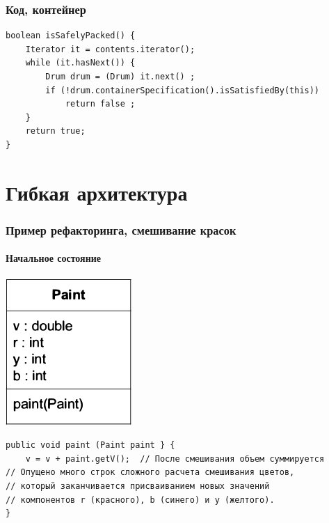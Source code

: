 \documentclass[xetex,mathserif,serif]{beamer}
\begin{document}
	\begin{frame}[fragile]
		\frametitle{Код, контейнер}
		\begin{verbatim}
boolean isSafelyPacked() {
    Iterator it = contents.iterator();
    while (it.hasNext()) {
        Drum drum = (Drum) it.next() ;
        if (!drum.containerSpecification().isSatisfiedBy(this))
            return false ;
    }
    return true;
}
		\end{verbatim}
\end{frame}

	\section{Гибкая архитектура}

	\begin{frame}[fragile]
		\frametitle{Пример рефакторинга, смешивание красок}
		\framesubtitle{Начальное состояние}
		\begin{center}
			\includegraphics[height=0.3\textheight]{originalPaint.png}
		\end{center}
		\begin{footnotesize}
			\begin{verbatim}
public void paint (Paint paint } {
    v = v + paint.getV();  // После смешивания объем суммируется
// Опущено много строк сложного расчета смешивания цветов,
// который заканчивается присваиванием новых значений
// компонентов r (красного), b (синего) и y (желтого).
}
			\end{verbatim}
		\end{footnotesize}
\end{frame}
\end{document}
